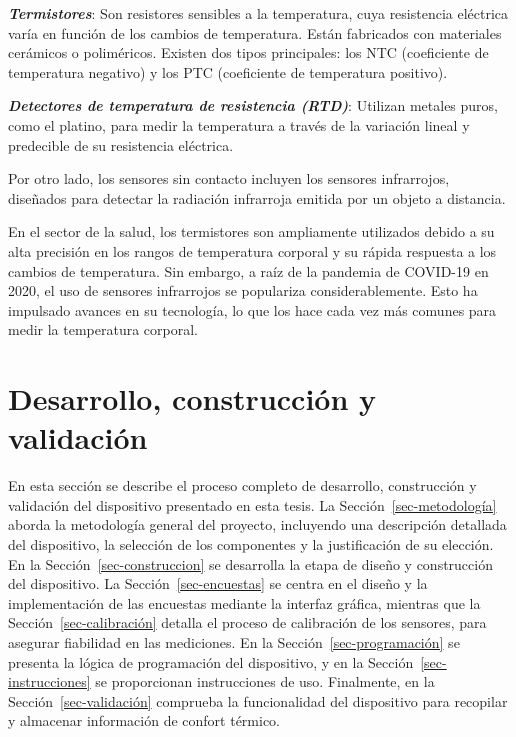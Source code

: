 \documentclass[
  letterpaper,
  DIV=11,
  numbers=noendperiod]{scrreport}
\begin{document}
\textbf{\emph{Termistores}}: Son resistores sensibles a la temperatura,
cuya resistencia eléctrica varía en función de los cambios de
temperatura. Están fabricados con materiales cerámicos o poliméricos.
Existen dos tipos principales: los NTC (coeficiente de temperatura
negativo) y los PTC (coeficiente de temperatura positivo).

\textbf{\emph{Detectores de temperatura de resistencia (RTD)}}: Utilizan
metales puros, como el platino, para medir la temperatura a través de la
variación lineal y predecible de su resistencia eléctrica.

Por otro lado, los sensores sin contacto incluyen los sensores
infrarrojos, diseñados para detectar la radiación infrarroja emitida por
un objeto a distancia.

En el sector de la salud, los termistores son ampliamente utilizados
debido a su alta precisión en los rangos de temperatura corporal y su
rápida respuesta a los cambios de temperatura. Sin embargo, a raíz de la
pandemia de COVID-19 en 2020, el uso de sensores infrarrojos se
populariza considerablemente. Esto ha impulsado avances en su
tecnología, lo que los hace cada vez más comunes para medir la
temperatura corporal.


\hypertarget{desarrollo-construcciuxf3n-y-validaciuxf3n}{%
\chapter{Desarrollo, construcción y
validación}\label{desarrollo-construcciuxf3n-y-validaciuxf3n}}

En esta sección se describe el proceso completo de desarrollo,
construcción y validación del dispositivo presentado en esta tesis. La
Sección~\ref{sec-metodología} aborda la metodología general del
proyecto, incluyendo una descripción detallada del dispositivo, la
selección de los componentes y la justificación de su elección. En la
Sección~\ref{sec-construccion} se desarrolla la etapa de diseño y
construcción del dispositivo. La Sección~\ref{sec-encuestas} se centra
en el diseño y la implementación de las encuestas mediante la interfaz
gráfica, mientras que la Sección~\ref{sec-calibración} detalla el
proceso de calibración de los sensores, para asegurar fiabilidad en las
mediciones. En la Sección~\ref{sec-programación} se presenta la lógica
de programación del dispositivo, y en la Sección~\ref{sec-instrucciones}
se proporcionan instrucciones de uso. Finalmente, en la
Sección~\ref{sec-validación} comprueba la funcionalidad del dispositivo
para recopilar y almacenar información de confort térmico.
\end{document}
